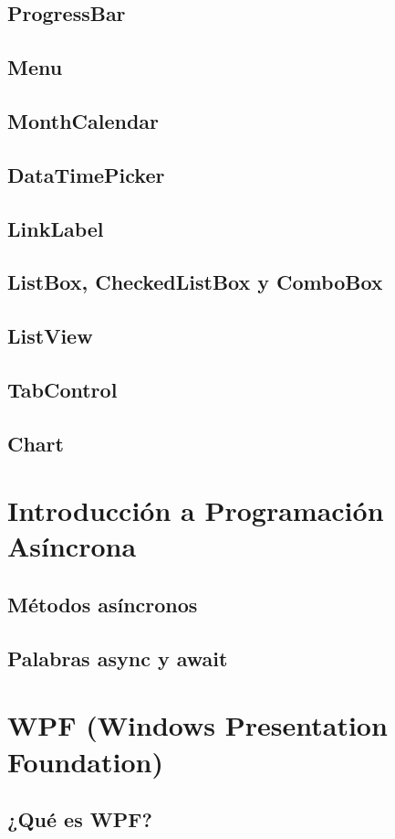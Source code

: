 \documentclass[12pt,a4paper]{report}
\begin{document}
\section{ProgressBar}
\section{Menu}
\section{MonthCalendar}
\section{DataTimePicker}
\section{LinkLabel}
\section{ListBox, CheckedListBox y ComboBox}
\section{ListView}
\section{TabControl}
\section{Chart}

\chapter{Introducción a Programación Asíncrona}
\section{Métodos asíncronos}
\section{Palabras async y await}

\chapter{WPF (Windows Presentation Foundation)}
\section{¿Qué es WPF?}
\end{document}
